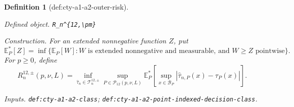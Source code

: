\documentclass{article}
\newtheorem{definition}{Definition}
\begin{document}
\begin{definition}[def:cty-a1-a2-outer-risk]\label{def:cty-a1-a2-outer-risk}
\par\smallskip\noindent\emph{Defined object.} \texttt{R\_\allowbreak{}n\textasciicircum{}\{12,\allowbreak{}\textbackslash{}\allowbreak{}pm\}\allowbreak{}}
\par\smallskip\noindent\emph{Construction.} For an extended nonnegative function \(Z\), put
\[
 \mathbb E_P^*[Z]=\inf\{\mathbb E_P[W]:W\text{ is extended nonnegative and measurable, and }W\geq Z\text{ pointwise}\}.
\]
For \(p\geq0\), define
\[
 R^{12,\pm}_n(p,\nu,L)=
 \inf_{\widehat\tau_n\in\mathcal T^{12,\pm}_n}
 \sup_{P\in\mathcal P_{12}(p,\nu,L)}
 \mathbb E_P^*\!\left[
 \sup_{x\in\mathcal B_P}|\widehat\tau_{n,P}(x)-\tau_P(x)|
 \right].
\]
\par\smallskip\noindent\emph{Inputs.} \texttt{def:\allowbreak{}cty-\allowbreak{}a1-\allowbreak{}a2-\allowbreak{}class}; \texttt{def:\allowbreak{}cty-\allowbreak{}a1-\allowbreak{}a2-\allowbreak{}point-\allowbreak{}indexed-\allowbreak{}decision-\allowbreak{}class}.
\end{definition}
\end{document}
